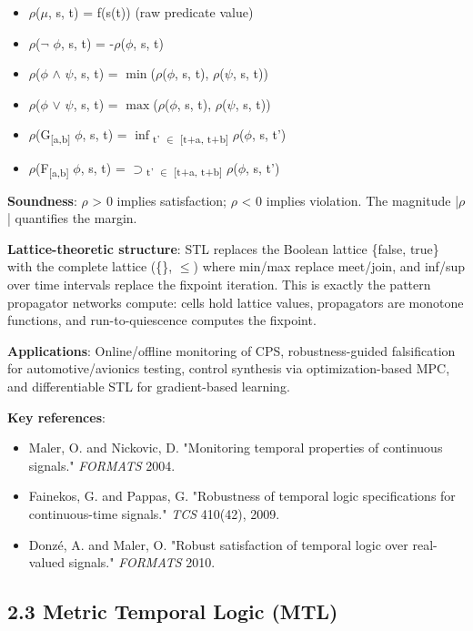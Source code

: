 \documentclass[11pt]{article}
\begin{document}
\begin{itemize}
\item \(\rho\)(\(\mu\), s, t) = f(s(t)) (raw predicate value)
\item \(\rho\)(\(\neg{}\) \(\phi\), s, t) = -\(\rho\)(\(\phi\), s, t)
\item \(\rho\)(\(\phi\) \(\land\) \(\psi\), s, t) = \(\min\)(\(\rho\)(\(\phi\), s, t), \(\rho\)(\(\psi\), s, t))
\item \(\rho\)(\(\phi\) \(\lor\) \(\psi\), s, t) = \(\max\)(\(\rho\)(\(\phi\), s, t), \(\rho\)(\(\psi\), s, t))
\item \(\rho\)(G\textsubscript{{[}a,b]} \(\phi\), s, t) = \(\inf\)\textsubscript{t' \(\in\) {[}t+a, t+b]} \(\rho\)(\(\phi\), s, t')
\item \(\rho\)(F\textsubscript{{[}a,b]} \(\phi\), s, t) = \(\supset\)\textsubscript{t' \(\in\) {[}t+a, t+b]} \(\rho\)(\(\phi\), s, t')
\end{itemize}

\textbf{Soundness}: \(\rho\) > 0 implies satisfaction; \(\rho\) < 0 implies violation. The
magnitude |\(\rho\)| quantifies the margin.

\textbf{Lattice-theoretic structure}: STL replaces the Boolean lattice \{false, true\}
with the complete lattice (\overline\{\}, \(\le\)) where min/max replace
meet/join, and inf/sup over time intervals replace the fixpoint iteration.
This is exactly the pattern propagator networks compute: cells hold lattice
values, propagators are monotone functions, and run-to-quiescence computes
the fixpoint.

\textbf{Applications}: Online/offline monitoring of CPS, robustness-guided
falsification for automotive/avionics testing, control synthesis via
optimization-based MPC, and differentiable STL for gradient-based learning.

\textbf{Key references}:
\begin{itemize}
\item Maler, O. and Nickovic, D. "Monitoring temporal properties of continuous signals." \emph{FORMATS} 2004.
\item Fainekos, G. and Pappas, G. "Robustness of temporal logic specifications for continuous-time signals." \emph{TCS} 410(42), 2009.
\item Donzé, A. and Maler, O. "Robust satisfaction of temporal logic over real-valued signals." \emph{FORMATS} 2010.
\end{itemize}
\subsection{2.3 Metric Temporal Logic (MTL)}
\label{sec:orge631957}
\end{document}
